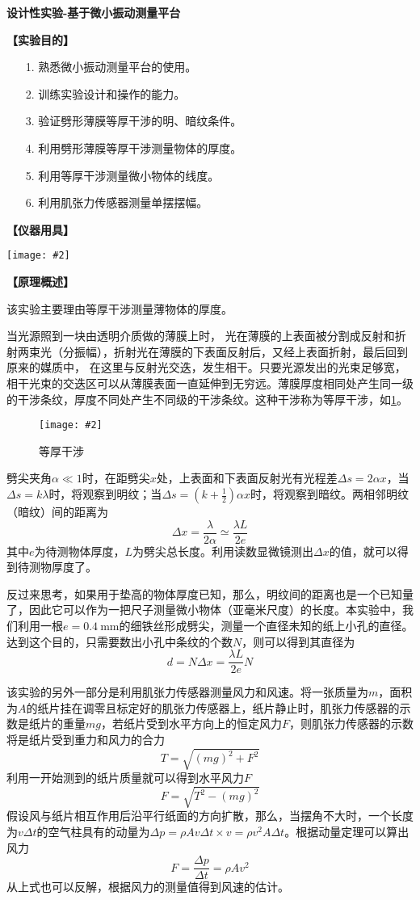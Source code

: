 \documentclass[11pt,a4paper]{ctexart}
\newcommand{\ExpeName}{设计性实验-基于微小振动测量平台}
\newcommand{\cpic}[2]{
\begin{center}
\texttt{[image: \#2]}
\end{center}
}
\newcommand{\cpicn}[3]
{
\begin{figure}[H]
\cpic{#1}{#2}
\caption{#3\label{#2}}
\end{figure}
}
\newcommand{\beq}{\begin{equation}}
\newcommand{\eeq}{\end{equation}}
\begin{document}
\newpage%
\begin{center}
\LARGE{\textbf{\ExpeName}}
\end{center}
\textbf{【实验目的】}
\begin{enumerate}
 \item[1.] 熟悉微小振动测量平台的使用。
 \item[2.] 训练实验设计和操作的能力。
 \item[3.] 验证劈形薄膜等厚干涉的明、暗纹条件。
 \item[4.] 利用劈形薄膜等厚干涉测量物体的厚度。
 \item[5.] 利用等厚干涉测量微小物体的线度。
 \item[6.] 利用肌张力传感器测量单摆摆幅。
\end{enumerate}
\textbf{【仪器用具】}
\cpic{0.3}{t1}
\textbf{【原理概述】}\par
该实验主要理由等厚干涉测量薄物体的厚度。\par
当光源照到一块由透明介质做的薄膜上时， 光在薄膜的上表面被分割成反射和折射两束光（分振幅），折射光在薄膜的下表面反射后，又经上表面折射，最后回到原来的媒质中， 在这里与反射光交迭，发生相干。只要光源发出的光束足够宽，相干光束的交迭区可以从薄膜表面一直延伸到无穷远。薄膜厚度相同处产生同一级的干涉条纹，厚度不同处产生不同级的干涉条纹。这种干涉称为等厚干涉，如\cref{p1}。\cpicn{0.7}{p1}{等厚干涉}
\par
劈尖夹角$\alpha \ll 1$时，在距劈尖$x$处，上表面和下表面反射光有光程差$\Delta s = 2\alpha x$，当$\Delta s = k \lambda$时，将观察到明纹；当$\Delta s = (k + \frac{1}{2}) \alpha x$时，将观察到暗纹。两相邻明纹（暗纹）间的距离为
\beq
\Delta x = \frac{\lambda}{2 \alpha} \simeq \frac{\lambda L}{2e}
\eeq
其中$e$为待测物体厚度，$L$为劈尖总长度。利用读数显微镜测出$\Delta x$的值，就可以得到待测物厚度了。
\par
反过来思考，如果用于垫高的物体厚度已知，那么，明纹间的距离也是一个已知量了，因此它可以作为一把尺子测量微小物体（亚毫米尺度）的长度。本实验中，我们利用一根$e = 0.4 \mathrm{\ mm}$的细铁丝形成劈尖，测量一个直径未知的纸上小孔的直径。达到这个目的，只需要数出小孔中条纹的个数$N$，则可以得到其直径为
\beq
d = N \Delta x = \frac{\lambda L}{2e} N
\eeq
\par
该实验的另外一部分是利用肌张力传感器测量风力和风速。将一张质量为$m$，面积为$A$的纸片挂在调零且标定好的肌张力传感器上，纸片静止时，肌张力传感器的示数是纸片的重量$mg$，若纸片受到水平方向上的恒定风力$F$，则肌张力传感器的示数将是纸片受到重力和风力的合力
\beq
T= \sqrt{(mg)^2 + F^2}
\eeq
利用一开始测到的纸片质量就可以得到水平风力$F$
\beq
F = \sqrt{T^2 - (mg)^2}
\eeq
假设风与纸片相互作用后沿平行纸面的方向扩散，那么，当摆角不大时，一个长度为$v \Delta t$的空气柱具有的动量为$ \Delta p = \rho A v \Delta t \times v = \rho v^2 A \Delta t$。根据动量定理可以算出风力
\beq F = \frac{\Delta p }{\Delta t} = \rho A v^2\eeq
从上式也可以反解，根据风力的测量值得到风速的估计。
\end{document}
